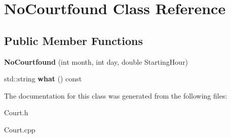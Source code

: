 \hypertarget{class_no_courtfound}{}\section{No\+Courtfound Class Reference}
\label{class_no_courtfound}
\subsection*{Public Member Functions}
\begin{DoxyCompactItemize}
\item 
\mbox{\label{class_no_courtfound_a5e23a986b5c59d782cf0148f29045896}} 
{\bfseries No\+Courtfound} (int month, int day, double Starting\+Hour)
\item 
\mbox{\label{class_no_courtfound_a338fab6e854c1c99a6268d18d605bd4b}} 
std\+::string {\bfseries what} () const
\end{DoxyCompactItemize}


The documentation for this class was generated from the following files\+:\begin{DoxyCompactItemize}
\item 
Court.\+h\item 
Court.\+cpp\end{DoxyCompactItemize}
